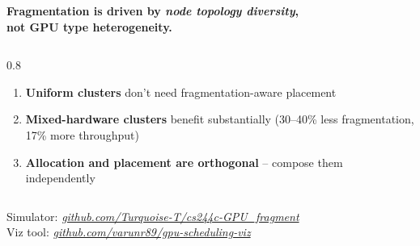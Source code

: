 \documentclass[aspectratio=169,pdf]{beamer}
\newcommand{\empr}[1]{{\color{cardinalred}\emph{#1}}}
\begin{document}
\begin{frame}{}

\vfill

\begin{center}

{\Large \textbf{Fragmentation is driven by \textit{node topology diversity},\\[6pt] not GPU type heterogeneity.}}

\vspace{24pt}

\begin{columns}[T]
\begin{column}{0.8\textwidth}
\begin{enumerate}
  \item \textbf{Uniform clusters} don't need fragmentation-aware placement
  \item \textbf{Mixed-hardware clusters} benefit substantially (30--40\% less fragmentation, 17\% more throughput)
  \item \textbf{Allocation and placement are orthogonal} -- compose them independently
\end{enumerate}
\end{column}
\end{columns}

\vspace{18pt}

\small
Simulator: \empr{\href{https://github.com/Turquoise-T/cs244c-GPU\_fragment}{github.com/Turquoise-T/cs244c-GPU\_fragment}}\\
Viz tool: \empr{\href{https://github.com/varunr89/gpu-scheduling-viz}{github.com/varunr89/gpu-scheduling-viz}}

\end{center}

\vfill


\end{frame}
\end{document}
